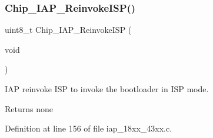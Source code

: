 \subsubsection{\texorpdfstring{Chip\+\_\+\+I\+A\+P\+\_\+\+Reinvoke\+I\+S\+P()}{Chip\_IAP\_ReinvokeISP()}}
{\footnotesize\ttfamily uint8\+\_\+t Chip\+\_\+\+I\+A\+P\+\_\+\+Reinvoke\+I\+SP (\begin{DoxyParamCaption}\item[{void}]{ }\end{DoxyParamCaption})}



I\+AP reinvoke I\+SP to invoke the bootloader in I\+SP mode. 

\begin{DoxyReturn}{Returns}
none 
\end{DoxyReturn}


Definition at line 156 of file iap\+\_\+18xx\+\_\+43xx.\+c.

